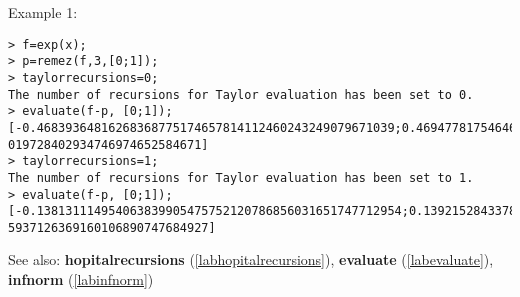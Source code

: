 \noindent Example 1: 
\begin{center}\begin{minipage}{15cm}\begin{Verbatim}[frame=single]
> f=exp(x);
> p=remez(f,3,[0;1]);
> taylorrecursions=0;
The number of recursions for Taylor evaluation has been set to 0.
> evaluate(f-p, [0;1]);
[-0.46839364816268368775174657814112460243249079671039;0.46947781754646820647293
019728402934746974652584671]
> taylorrecursions=1;
The number of recursions for Taylor evaluation has been set to 1.
> evaluate(f-p, [0;1]);
[-0.138131114954063839905475752120786856031651747712954;0.1392152843378483586266
5937126369160106890747684927]
\end{Verbatim}
\end{minipage}\end{center}
See also: \textbf{hopitalrecursions} (\ref{labhopitalrecursions}), \textbf{evaluate} (\ref{labevaluate}), \textbf{infnorm} (\ref{labinfnorm})
